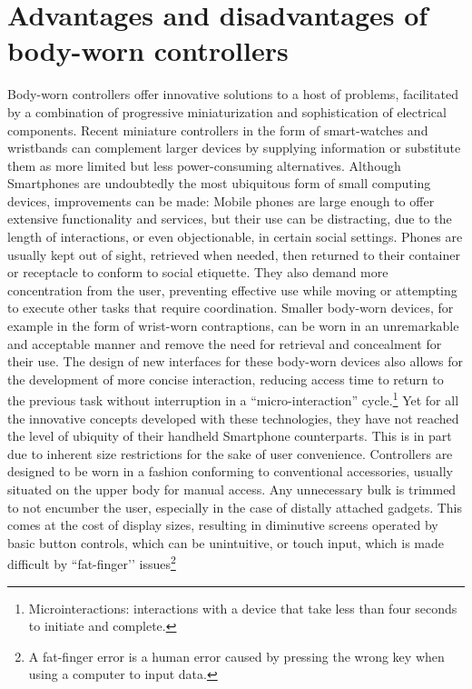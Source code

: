 \documentclass{sigchi}
\begin{document}
\section{Advantages and disadvantages of body-worn controllers}
Body-worn controllers offer innovative solutions to a host of problems, facilitated by a combination of progressive miniaturization and sophistication of electrical components. Recent miniature controllers in the form of smart-watches and wristbands can complement larger devices by supplying information or substitute them as more limited but less power-consuming alternatives. \cite{motion-ui} Although Smartphones are undoubtedly the most ubiquitous form of small computing devices, improvements can be made: Mobile phones are large enough to offer extensive functionality and services, but their use can be distracting, due to the length of interactions, or even objectionable, in certain social settings. Phones are usually kept out of sight, retrieved when needed, then returned to their container or receptacle to conform to social etiquette. They also demand more concentration from the user, preventing effective use while moving or attempting to execute other tasks that require coordination. Smaller body-worn devices, for example in the form of wrist-worn contraptions, can be worn in an unremarkable and acceptable manner and remove the need for retrieval and concealment for their use. The design of new interfaces for these body-worn devices also allows for the development of more concise interaction, reducing access time to return to the previous task without interruption in a “micro-interaction” cycle.\footnote{Microinteractions: interactions with a device that take less than four seconds to initiate and complete.} \cite{microinteraction}
Yet for all the innovative concepts developed with these technologies, they have not reached the level of ubiquity of their handheld Smartphone counterparts.
This is in part due to inherent size restrictions for the sake of user convenience. Controllers are designed to be worn in a fashion conforming to conventional accessories, usually situated on the upper body for manual access. Any unnecessary bulk is trimmed to not encumber the user, especially in the case of distally attached gadgets. This comes at the cost of display sizes, resulting in diminutive screens operated by basic button controls, which can be unintuitive, or touch input, which is made difficult by ``fat-finger’’ issues\footnote{A fat-finger error is a human error caused by pressing the wrong key when using a computer to input data.} %
\end{document}
